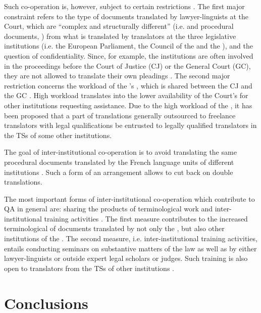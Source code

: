 \documentclass[output=paper]{langsci/langscibook}
\begin{document}
Such co-operation is, however, subject to certain restrictions \citep[1]{Annex2010}. The first major constraint refers to the type of documents translated by lawyer-linguists at the Court, which are “complex and structurally different” (i.e.  and procedural documents, \citealt{Annex2010}) from what is translated by translators at the three legislative institutions (i.e. the European Parliament, the Council of the  and the ), and the question of confidentiality. Since, for example, the  institutions are often involved in the proceedings before the Court of Justice (CJ) or the General Court (GC), they are not allowed to translate their own pleadings \citep[2]{Annex2010}. The second major restriction concerns the workload of the ’s , which is shared between the CJ and the GC \citep[2]{Annex2010}. High workload translates into the lower availability of the Court’s  for other institutions requesting assistance. Due to the high workload of the , it has been proposed that a part of translations generally outsourced to freelance translators with legal qualifications be entrusted to legally qualified translators in the TSs of some other  institutions.

The goal of inter-institutional co-operation is to avoid translating the same procedural documents translated by the French language units of different  institutions \citep[3]{Annex2010}. Such a form of an arrangement allows to cut back on double translations.

The most important forms of inter-institutional co-operation which contribute to QA in general are: sharing the products of terminological work and inter-institutional training activities \citep[3]{Annex2010}. The first measure contributes to the increased terminological  of documents translated by not only the , but also other institutions of the . The second measure, i.e. inter-institutional training activities, entails conducting seminars on substantive matters of the law as well as  by either  lawyer-linguists or outside expert legal scholars or judges. Such training is also open to translators from the TSs of other  institutions \citep[3]{Annex2010}.

\section{Conclusions}\label{sec:kozbial:5}
\end{document}
